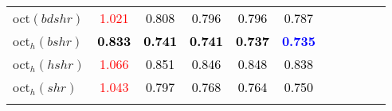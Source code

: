 \begin{tabular}[t]{l|>{}cccc>{}c|ccccc}
oct$(bdshr)$ & \textcolor{red}{1.021} & \textcolor{black}{0.808} & \textcolor{black}{0.796} & \textcolor{black}{0.796} & \textcolor{black}{0.787} &  &  &  &  & \\
oct$_h(bshr)$ & \textcolor{black}{\textbf{0.833}} & \textcolor{black}{\textbf{0.741}} & \textcolor{black}{\textbf{0.741}} & \textcolor{black}{\textbf{0.737}} & \textcolor{blue}{\textbf{0.735}} &  &  &  &  & \\
oct$_h(hshr)$ & \textcolor{red}{1.066} & \textcolor{black}{0.851} & \textcolor{black}{0.846} & \textcolor{black}{0.848} & \textcolor{black}{0.838} &  &  &  &  & \\
oct$_h(shr)$ & \textcolor{red}{1.043} & \textcolor{black}{0.797} & \textcolor{black}{0.768} & \textcolor{black}{0.764} & \textcolor{black}{0.750} &  &  &  &  & \\
\bottomrule
{}\\
\end{tabular}
